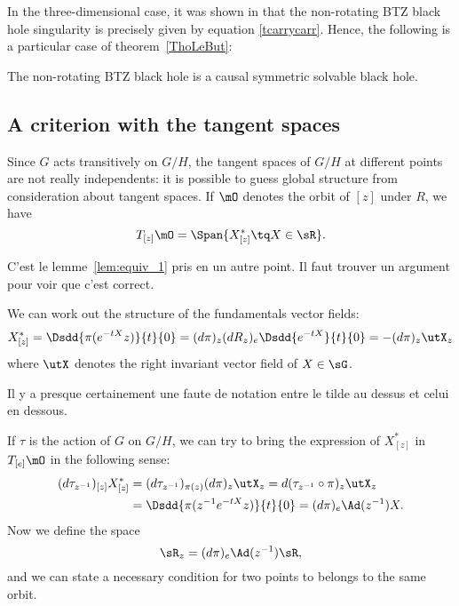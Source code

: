 In the three-dimensional case, it was shown in \cite{BTZ_deux,BTZB_un} that the non-rotating BTZ black hole singularity is precisely given by equation \eqref{tcarrycarr}. Hence, the following is a particular case of theorem~\ref{ThoLeBut}:

\begin{corollary}
	The non-rotating BTZ black hole is a causal symmetric solvable black hole.
\end{corollary}

\subsection{A criterion with the tangent spaces}\label{subsec:R_z}

Since $G$ acts transitively on $G/H$, the tangent spaces of $G/H$ at different points are not really independents: it is possible to guess global structure from consideration about tangent spaces. If $\mO$ denotes the orbit of $[z]$ under $R$, we have
\[
	T_{[z]}\mO=\Span\{X^*_{[z]}\tq X\in\sR\}.
\]
\begin{probleme}
	C'est le lemme~\ref{lem:equiv_1} pris en un autre point. Il faut trouver un argument pour voir que c'est correct.
\end{probleme}

We can work out the structure of the fundamentals vector fields:
\begin{equation}
	X^*_{[z]}=\Dsdd{ \pi(e^{-tX}z) }{t}{0}
	=(d\pi)_z(dR_z)_e\Dsdd{e^{-tX}}{t}{0}
	=-(d\pi)_z\utX_z
\end{equation}
where $\utX$ denotes the right invariant vector field of $X\in\sG$.

\begin{probleme}
	Il y a presque certainement une faute de notation entre le tilde au dessus et celui en dessous.
\end{probleme}

If $\tau$ is the action of $G$ on $G/H$, we can try to bring the expression of $X^*_{[z]}$ in $T_{[e]}\mO$ in the following sense:
\begin{equation}
	\begin{split}
		(d\tau_{z^{-1}})_{[z]}X^*_{[z]}&=(d\tau_{z^{-1}})_{\pi(z)}(d\pi)_z\utX_z
		=d(\tau_{z^{-1}}\circ \pi)_z\utX_z\\
		&=\Dsdd{ \pi( z^{-1} e^{-tX}z ) }{t}{0}
		=(d\pi)_e\Ad(z^{-1})X.
	\end{split}
\end{equation}
Now we define the space
\begin{equation}
	\sR_z=(d\pi)_e\Ad(z^{-1})\sR,
\end{equation}
and we can state a necessary condition for two points to belongs to the same orbit.


